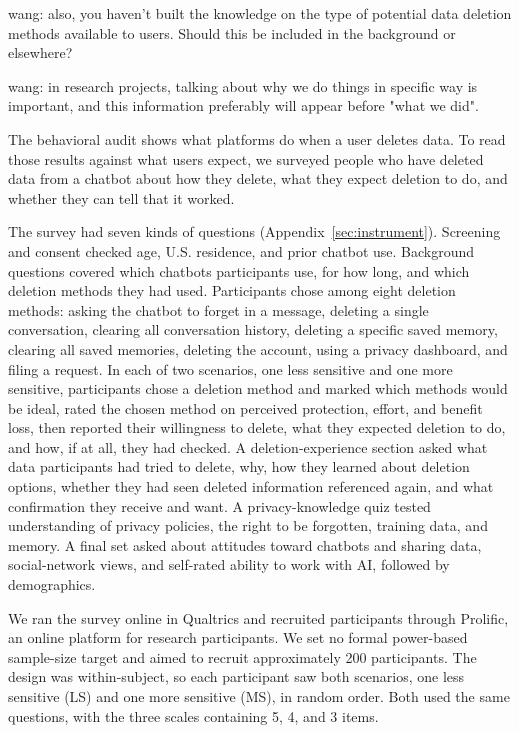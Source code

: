 \documentclass[conference,compsoc]{IEEEtran}
\newcommand{\xw}[1] {{\color{red}wang: #1}}
\begin{document}
\xw{also, you haven't built the knowledge on the type of potential data deletion methods available to users. Should this be included in the background or elsewhere?}

\xw{in research projects, talking about why we do things in specific way is important, and this information preferably will appear before "what we did".}

The behavioral audit shows what platforms do when a user deletes data. To read those results against what users expect, we surveyed people who have deleted data from a chatbot about how they delete, what they expect deletion to do, and whether they can tell that it worked.

The survey had seven kinds of questions (Appendix~\ref{sec:instrument}). Screening and consent checked age, U.S. residence, and prior chatbot use. Background questions covered which chatbots participants use, for how long, and which deletion methods they had used. Participants chose among eight deletion methods: asking the chatbot to forget in a message, deleting a single conversation, clearing all conversation history, deleting a specific saved memory, clearing all saved memories, deleting the account, using a privacy dashboard, and filing a request. In each of two scenarios, one less sensitive and one more sensitive, participants chose a deletion method and marked which methods would be ideal, rated the chosen method on perceived protection, effort, and benefit loss, then reported their willingness to delete, what they expected deletion to do, and how, if at all, they had checked. A deletion-experience section asked what data participants had tried to delete, why, how they learned about deletion options, whether they had seen deleted information referenced again, and what confirmation they receive and want. A privacy-knowledge quiz tested understanding of privacy policies, the right to be forgotten, training data, and memory. A final set asked about attitudes toward chatbots and sharing data, social-network views, and self-rated ability to work with AI, followed by demographics.

We ran the survey online in Qualtrics and recruited participants through Prolific, an online platform for research participants. We set no formal power-based sample-size target and aimed to recruit approximately 200 participants. The design was within-subject, so each participant saw both scenarios, one less sensitive (LS) and one more sensitive (MS), in random order. Both used the same questions, with the three scales containing 5, 4, and 3 items.
\end{document}
